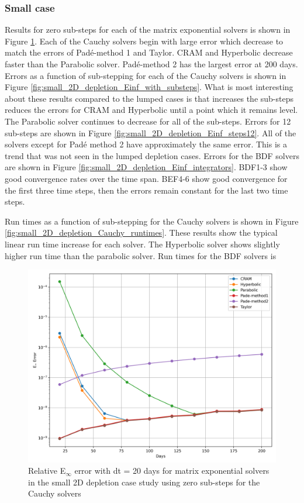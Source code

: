 \subsubsection{Small case}
Results for zero sub-steps for each of the matrix exponential solvers is shown in Figure \ref{fig:small_2D_depletion_Einf_steps0}. Each of the Cauchy solvers begin with large error which decrease to match the errors of Pad\'e-method 1 and Taylor. CRAM and Hyperbolic decrease faster than the Parabolic solver. Pad\'e-method 2 has the largest error at 200 days. Errors as a function of sub-stepping for each of the Cauchy solvers is shown in Figure \ref{fig:small_2D_depletion_Einf_with_substeps}. What is most interesting about these results compared to the lumped cases is that increases the sub-steps reduces the errors for CRAM and Hyperbolic until a point which it remains level. The Parabolic solver continues to decrease for all of the sub-steps. Errors for 12 sub-steps are shown in Figure \ref{fig:small_2D_depletion_Einf_steps12}. All of the solvers except for Pad\'e method 2 have approximately the same error. This is a trend that was not seen in the lumped depletion cases. Errors for the BDF solvers are shown in Figure \ref{fig:small_2D_depletion_Einf_integrators}. BDF1-3 show good convergence rates over the time span. BEF4-6 show good convergence for the first three time steps, then the errors remain constant for the last two time steps. 

Run times as a function of sub-stepping for the Cauchy solvers is shown in Figure \ref{fig:small_2D_depletion_Cauchy_runtimes}. These results show the typical linear run time increase for each solver. The Hyperbolic solver shows slightly higher run time than the parabolic solver. Run times for the BDF solvers is 

\clearpage

\begin{figure}[p]
    \centering
    \includegraphics[width=5in]{images/chapter-5/caseStudies/small2DDepletion/msrSmall2DDepletionEinfErrorerrorSteps0.png}
    \caption{Relative E$_{\infty}$ error with dt = 20 days for matrix exponential solvers in the small 2D depletion case study using zero sub-steps for the Cauchy solvers}
    \label{fig:small_2D_depletion_Einf_steps0}
\end{figure}

